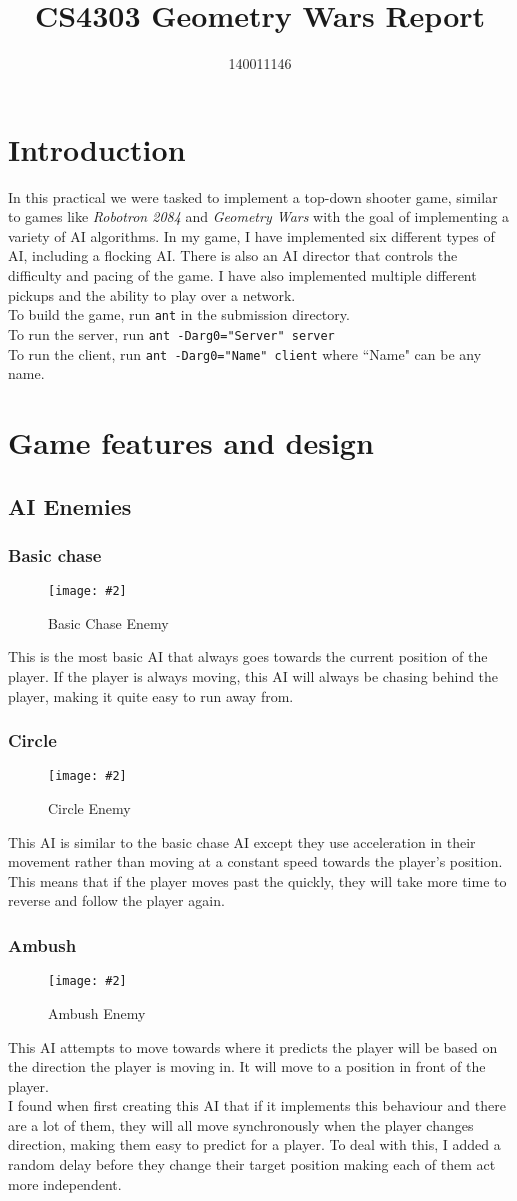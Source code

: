 \documentclass{article}
\title{CS4303 Geometry Wars Report}
\author{140011146}
\newcommand{\n}[0]{\\[\baselineskip]}
\newcommand{\figimg}[3]{
  \begin{figure}[H]
    \centering
    \texttt{[image: \#2]}
    \caption{#3}
  \end{figure}
  \noindent 
}
\begin{document}
\maketitle

\section{Introduction}
In this practical we were tasked to implement a top-down shooter game, similar to games like \textit{Robotron 2084} and \textit{Geometry Wars} with the goal of implementing a variety of AI algorithms. In my game, I have implemented six different types of AI, including a flocking AI. There is also an AI director that controls the difficulty and pacing of the game. I have also implemented multiple different pickups and the ability to play over a network.
\n
To build the game, run \texttt{ant} in the submission directory.
\\
\noindent
To run the server, run \texttt{ant -Darg0="Server" server}
\\
\noindent
To run the client, run \texttt{ant -Darg0="Name" client} where ``Name" can be any name.
\section{Game features and design}
\subsection{AI Enemies}
\subsubsection{Basic chase}
\figimg{0.1}{imgs/BasicChaseEnemy.png}{Basic Chase Enemy}
This is the most basic AI that always goes towards the current position of the player. If the player is always moving, this AI will always be chasing behind the player, making it quite easy to run away from.

\subsubsection{Circle}
\figimg{0.1}{imgs/CircleEnemy.png}{Circle Enemy}
This AI is similar to the basic chase AI except they use acceleration in their movement rather than moving at a constant speed towards the player's position. This means that if the player moves past the quickly, they will take more time to reverse and follow the player again. 

\subsubsection{Ambush}
\figimg{0.1}{imgs/AmbushEnemy.png}{Ambush Enemy}
This AI attempts to move towards where it predicts the player will be based on the direction the player is moving in. It will move to a position in front of the player. 
\n
I found when first creating this AI that if it implements this behaviour and there are a lot of them, they will all move synchronously when the player changes direction, making them easy to predict for a player. To deal with this, I added a random delay before they change their target position making each of them act more independent.
\end{document}
